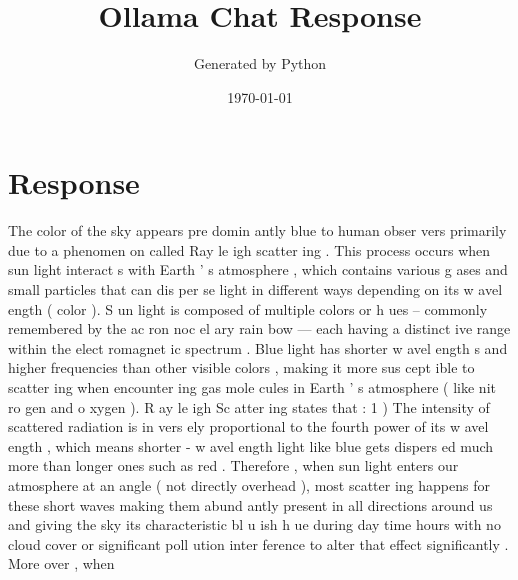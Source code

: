 \documentclass{article}%
\title{Ollama Chat Response}%
\author{Generated by Python}%
\date{\today}%
\begin{document}
%
\normalsize%
\maketitle%
\section{Response}%
\label{sec:Response}%
The%
 color%
 of%
 the%
 sky%
 appears%
 pre%
domin%
antly%
 blue%
 to%
 human%
 obser%
vers%
 primarily%
 due%
 to%
 a%
 phenomen%
on%
 called%
 Ray%
le%
igh%
 scatter%
ing%
.%
 This%
 process%
 occurs%
 when%
 sun%
light%
 interact%
s%
 with%
 Earth%
'%
s%
 atmosphere%
,%
 which%
 contains%
 various%
 g%
ases%
 and%
 small%
 particles%
 that%
 can%
 dis%
per%
se%
 light%
 in%
 different%
 ways%
 depending%
 on%
 its%
 w%
avel%
ength%
 (%
color%
).%
\newline%
%
\newline%
%
S%
un%
light%
 is%
 composed%
 of%
 multiple%
 colors%
 or%
 h%
ues%
 –%
 commonly%
 remembered%
 by%
 the%
 ac%
ron%
noc%
el%
ary%
 rain%
bow%
 —%
 each%
 having%
 a%
 distinct%
ive%
 range%
 within%
 the%
 elect%
romagnet%
ic%
 spectrum%
.%
 Blue%
 light%
 has%
 shorter%
 w%
avel%
ength%
s%
 and%
 higher%
 frequencies%
 than%
 other%
 visible%
 colors%
,%
 making%
 it%
 more%
 sus%
cept%
ible%
 to%
 scatter%
ing%
 when%
 encounter%
ing%
 gas%
 mole%
cules%
 in%
 Earth%
'%
s%
 atmosphere%
 (%
like%
 nit%
ro%
gen%
 and%
 o%
xygen%
).%
\newline%
%
\newline%
%
R%
ay%
le%
igh%
 Sc%
atter%
ing%
 states%
 that%
:%
\newline%
%
1%
)%
 The%
 intensity%
 of%
 scattered%
 radiation%
 is%
 in%
vers%
ely%
 proportional%
 to%
 the%
 fourth%
 power%
 of%
 its%
 w%
avel%
ength%
,%
 which%
 means%
 shorter%
{-}%
w%
avel%
ength%
 light%
 like%
 blue%
 gets%
 dispers%
ed%
 much%
 more%
 than%
 longer%
 ones%
 such%
 as%
 red%
.%
 Therefore%
,%
 when%
 sun%
light%
 enters%
 our%
 atmosphere%
 at%
 an%
 angle%
 (%
not%
 directly%
 overhead%
),%
 most%
 scatter%
ing%
 happens%
 for%
 these%
 short%
 waves%
 making%
 them%
 abund%
antly%
 present%
 in%
 all%
 directions%
 around%
 us%
 and%
 giving%
 the%
 sky%
 its%
 characteristic%
 bl%
u%
ish%
 h%
ue%
 during%
 day%
time%
 hours%
 with%
 no%
 cloud%
 cover%
 or%
 significant%
 poll%
ution%
 inter%
ference%
 to%
 alter%
 that%
 effect%
 significantly%
.%
\newline%
%
\newline%
%
More%
over%
,%
 when%
\end{document}
